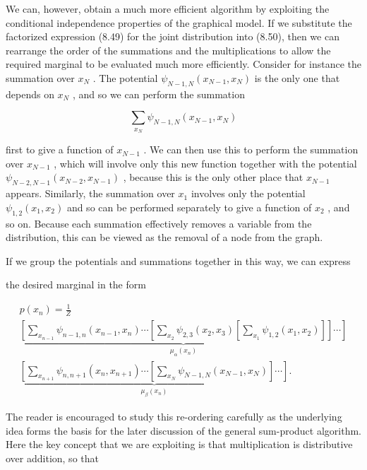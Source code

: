 \documentclass[
  10
]{article}
\begin{document}
We can, however, obtain a much more efficient algorithm by exploiting
the conditional independence properties of the graphical model. If we
substitute the factorized expression (8.49) for the joint distribution
into (8.50), then we can rearrange the order of the summations and the
multiplications to allow the required marginal to be evaluated much more
efficiently. Consider for instance the summation over \(x _ { N }\) .
The potential \(\psi _ { N - 1 , N } ( x _ { N - 1 } , x _ { N } )\) is
the only one that depends on \(x _ { N }\) , and so we can perform the
summation

\[
\sum_ {x _ {N}} \psi_ {N - 1, N} (x _ {N - 1}, x _ {N})\tag{8.51}
\]

first to give a function of \(x _ { N - 1 }\) . We can then use this to
perform the summation over \(x _ { N - 1 }\) , which will involve only
this new function together with the potential
\(\psi _ { N - 2 , N - 1 } ( x _ { N - 2 } , x _ { N - 1 } )\) , because
this is the only other place that \(x _ { N - 1 }\) appears. Similarly,
the summation over \(x _ { 1 }\) involves only the potential
\(\psi _ { 1 , 2 } ( x _ { 1 } , x _ { 2 } )\) and so can be performed
separately to give a function of \(x _ { 2 }\) , and so on. Because each
summation effectively removes a variable from the distribution, this can
be viewed as the removal of a node from the graph.

If we group the potentials and summations together in this way, we can
express

the desired marginal in the form

\[
\begin{array}{l} p (x _ {n}) = \frac {1}{Z} \\ \underbrace {\left[ \sum_ {x _ {n - 1}} \psi_ {n - 1 , n} (x _ {n - 1} , x _ {n}) \cdots \left[ \sum_ {x _ {2}} \psi_ {2 , 3} (x _ {2} , x _ {3}) \left[ \sum_ {x _ {1}} \psi_ {1 , 2} (x _ {1} , x _ {2}) \right] \right] \cdots \right]} _ {\mu_ {\alpha} (x _ {n})} \\ \underbrace {\left[ \sum_ {x _ {n + 1}} \psi_ {n , n + 1} (x _ {n} , x _ {n + 1}) \cdots \left[ \sum_ {x _ {N}} \psi_ {N - 1 , N} (x _ {N - 1} , x _ {N}) \right] \cdots \right]} _ {\mu_ {\beta} (x _ {n})}. \end{array} \tag {8.5}\tag{8.52}
\]

The reader is encouraged to study this re-ordering carefully as the
underlying idea forms the basis for the later discussion of the general
sum-product algorithm. Here the key concept that we are exploiting is
that multiplication is distributive over addition, so that
\end{document}
